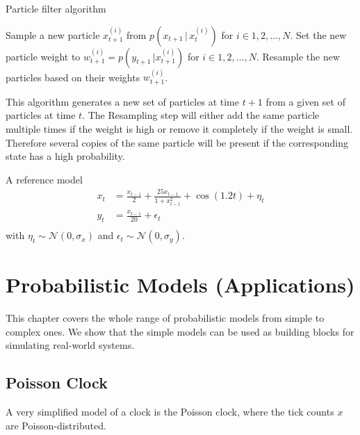 \documentclass{tstextbook}
\begin{document}
\begin{algorithm}
\caption{Particle filter algorithm}
\begin{algorithmic}[1]
\State Sample a new particle $x^{(i)}_{t+1}$ from $p\left(x_{t+1}\,\vert\,x^{(i)}_{t}\right)$ for $i\in 1,2,\ldots,N$. 
\State Set the new particle weight to $w^{(i)}_{t+1} = p\left(y_{t+1}\,\vert x^{(i)}_{t+1}\right)$ for $i\in 1,2,\ldots,N$.
\State Resample the new particles based on their weights $w^{(i)}_{t+1}$. 
\end{algorithmic}
\end{algorithm}

This algorithm generates a new set of particles at time $t+1$ from a given set of particles at time $t$. The Resampling step will either add the same particle multiple times if the weight is high or remove it completely if the weight is small. Therefore several copies of the same particle will be present if the corresponding state has a high probability.

\begin{example}
A reference model \cite{klaas2012} 
\begin{equation}
\begin{aligned}
x_t&=\frac{x_{t-1}}{2}+\frac{25 x_{t-1}}{1+x_{t-1}^2}+\cos(1.2 t)+\eta_t\\
y_t&=\frac{x_{t-1}}{20}+\epsilon_t \\
\end{aligned}
\end{equation}
with $\eta_t\sim \mathcal{N}(0,\sigma_x)$ and $\epsilon_t
\sim \mathcal{N}(0,\sigma_y)$.
\end{example} 

\chapter{Probabilistic Models (Applications)}

\begin{summary}
  This chapter covers the whole range of probabilistic models from simple to complex ones. We show that the simple models can be used as building blocks for simulating real-world systems.
\end{summary}

\section{Poisson Clock}
A very simplified model of a clock is the Poisson clock, where the tick counts $x$ are Poisson-distributed.
\end{document}
